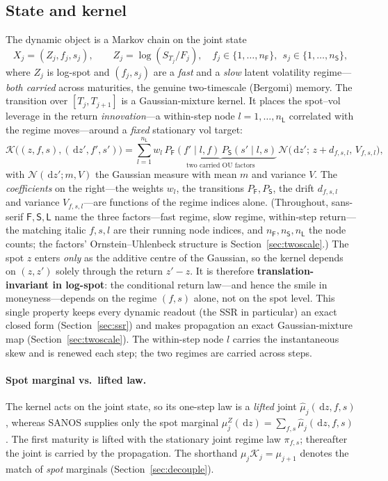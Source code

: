 \documentclass[11pt]{article}
\newcommand{\cK}{\mathcal{K}}
\newcommand{\cN}{\mathcal{N}}
\newcommand{\dd}{\,\mathrm{d}}
\begin{document}
\subsection{State and kernel}
The dynamic object is a Markov chain on the joint state
\begin{equation}
X_j=(Z_j,f_j,s_j),\qquad Z_j=\log(S_{T_j}/F_j),\quad
f_j\in\{1,\dots,n_{\mathsf{F}}\},\ \ s_j\in\{1,\dots,n_{\mathsf{S}}\},
\end{equation}
where $Z_j$ is log-spot and $(f_j,s_j)$ are a \emph{fast} and a \emph{slow} latent
volatility regime---\emph{both carried} across maturities, the genuine two-timescale
(Bergomi) memory. The transition over $[T_j,T_{j+1}]$ is a Gaussian-mixture kernel. It
places the spot--vol leverage in the return \emph{innovation}---a within-step node
$l=1,\dots,n_{\mathsf{L}}$ correlated with the regime moves---around a \emph{fixed} stationary vol
target:
\begin{equation}
\cK\big((z,f,s),(\dd z',f',s')\big)=\sum_{l=1}^{n_{\mathsf{L}}} w_l\,
\underbrace{P_{\mathsf{F}}(f'\mid l,f)\,P_{\mathsf{S}}(s'\mid l,s)}_{\text{two carried OU factors}}\,
\cN\!\big(\dd z';\,z+d_{f,s,l},\,V_{f,s,l}\big),
\label{eq:kernel}
\end{equation}
with $\cN(\dd z';m,V)$ the Gaussian measure with mean $m$ and variance $V$.
The \emph{coefficients} on the right---the weights $w_l$, the transitions $P_{\mathsf{F}},P_{\mathsf{S}}$, the drift
$d_{f,s,l}$ and variance $V_{f,s,l}$---are functions of the regime indices alone. (Throughout, sans-serif
$\mathsf{F},\mathsf{S},\mathsf{L}$ name the three factors---fast regime, slow regime, within-step
return---the matching italic $f,s,l$ are their running node indices, and $n_{\mathsf{F}},n_{\mathsf{S}},n_{\mathsf{L}}$
the node counts; the factors' Ornstein--Uhlenbeck structure is Section~\ref{sec:twoscale}.) The spot $z$
enters \emph{only} as the additive centre of the Gaussian, so the kernel depends on $(z,z')$
solely through the return $z'-z$. It is therefore \textbf{translation-invariant in log-spot}: the
conditional return law---and hence the smile in moneyness---depends on the regime $(f,s)$ alone, not on
the spot level. This single property keeps every dynamic readout (the SSR in particular) an exact closed
form (Section~\ref{sec:ssr}) and makes propagation an exact Gaussian-mixture map
(Section~\ref{sec:twoscale}). The within-step node $l$ carries the instantaneous skew and is
renewed each step; the two regimes are carried across steps.

\paragraph{Spot marginal vs.\ lifted law.} The kernel acts on the joint state, so its
one-step law is a \emph{lifted} joint $\widehat\mu_j(\dd z,f,s)$, whereas SANOS supplies
only the spot marginal $\mu_j^Z(\dd z)=\sum_{f,s}\widehat\mu_j(\dd z,f,s)$. The first
maturity is lifted with the stationary joint regime law $\pi_{f,s}$; thereafter the joint
is carried by the propagation. The shorthand $\mu_j\cK_j=\mu_{j+1}$ denotes the match of
\emph{spot} marginals (Section~\ref{sec:decouple}).
\end{document}
